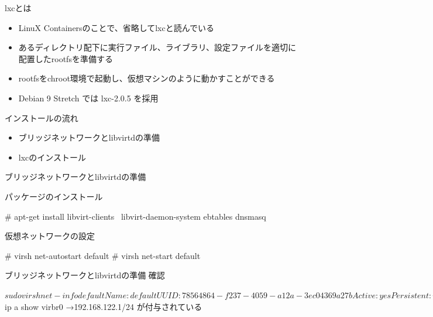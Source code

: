 
\begin{frame}[containsverbatim]{lxcとは}
  \begin{itemize}
  \item LinuX Containersのことで、省略してlxcと読んでいる
  \item あるディレクトリ配下に実行ファイル、ライブラリ、設定ファイルを適切に配置したrootfsを準備する
  \item rootfsをchroot環境で起動し、仮想マシンのように動かすことができる
  \item Debian 9 Stretch では lxc-2.0.5 を採用
  \end{itemize}
\end{frame}



\begin{frame}[containsverbatim]{インストールの流れ}
  \begin{itemize}
  \item ブリッジネットワークとlibvirtdの準備
  \item lxcのインストール
  \end{itemize}
\end{frame}


\begin{frame}[containsverbatim]{ブリッジネットワークとlibvirtdの準備}

パッケージのインストール
\begin{commandline}
  # apt-get install libvirt-clients \
  libvirt-daemon-system ebtables dnsmasq
\end{commandline}

仮想ネットワークの設定
\begin{commandline}
  # virsh net-autostart default
  # virsh net-start default
\end{commandline}

\end{frame}


\begin{frame}[containsverbatim]{ブリッジネットワークとlibvirtdの準備}
確認
\begin{commandline}
  $ sudo virsh net-info default
  Name:           default
  UUID:           78564864-f237-4059-a12a-3ec04369a27b
  Active:         yes
  Persistent:     yes
  Autostart:      yes
  Bridge:         virbr0
  
  $ ip a show virbr0
  →192.168.122.1/24 が付与されている
\end{commandline}

\end{frame}


